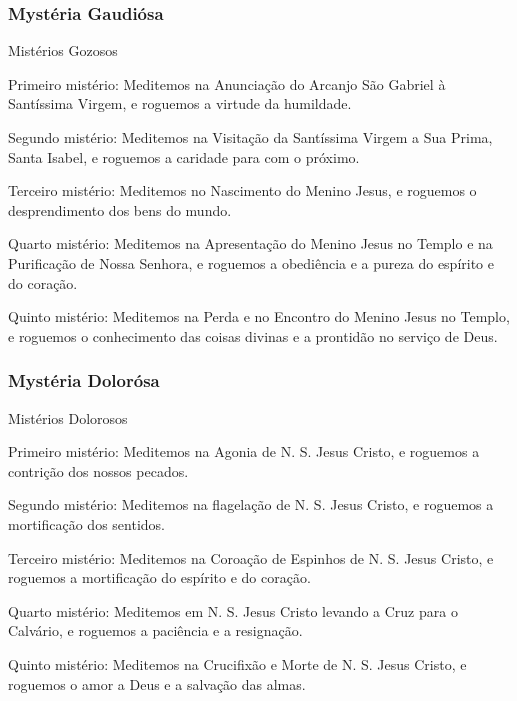 \subsubsection{Mystéria Gaudiósa}
\begin{nscenter}Mistérios Gozosos\end{nscenter}
\begin{nscenter}\emph{}\end{nscenter}

{\redx Primeiro mistério:} Meditemos na Anunciação do Arcanjo São Gabriel à Santíssima Virgem, e roguemos a virtude da humildade.\par
{\redx Segundo mistério:} Meditemos na Visitação da Santíssima Virgem a Sua Prima, Santa Isabel, e roguemos a caridade para com o próximo.\par
{\redx Terceiro mistério:} Meditemos no Nascimento do Menino Jesus, e roguemos o desprendimento dos bens do mundo.\par
{\redx Quarto mistério:} Meditemos na Apresentação do Menino Jesus no Templo e na Purificação de Nossa Senhora, e roguemos a obediência e a pureza do espírito e do coração.\par
{\redx Quinto mistério:} Meditemos na Perda e no Encontro do Menino Jesus no Templo, e roguemos o conhecimento das coisas divinas e a prontidão no serviço de Deus.

\subsubsection{Mystéria Dolorósa}
\begin{nscenter}Mistérios Dolorosos\end{nscenter}
\begin{nscenter}\emph{}\end{nscenter}

{\redx Primeiro mistério:} Meditemos na Agonia de N. S. Jesus Cristo, e roguemos a contrição dos nossos pecados.\par
{\redx Segundo mistério:} Meditemos na flagelação de N. S. Jesus Cristo, e roguemos a mortificação dos sentidos.\par
{\redx Terceiro mistério:} Meditemos na Coroação de Espinhos de N. S. Jesus Cristo, e roguemos a mortificação do espírito e do coração.\par
{\redx Quarto mistério:} Meditemos em N. S. Jesus Cristo levando a Cruz para o Calvário, e roguemos a paciência e a resignação.\par
{\redx Quinto mistério:} Meditemos na Crucifixão e Morte de N. S. Jesus Cristo, e roguemos o amor a Deus e a salvação das almas.

